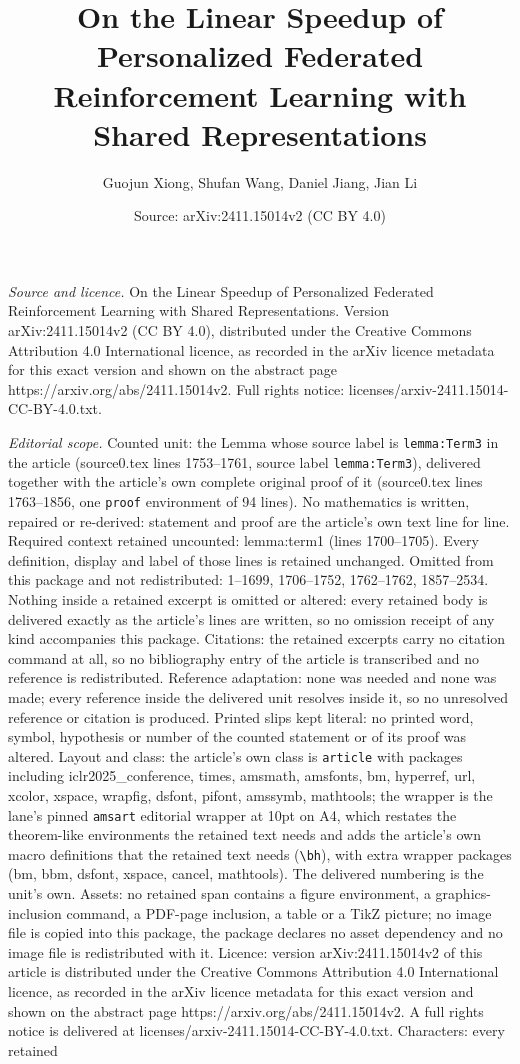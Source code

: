 \documentclass[10pt,a4paper]{amsart}
\title[On the Linear Speedup of Personalized Federated Reinforcemen]{On the Linear Speedup of Personalized Federated Reinforcement Learning with Shared Representations}
\author{Guojun Xiong, Shufan Wang, Daniel Jiang, Jian Li}
\date{Source: arXiv:2411.15014v2 (CC BY 4.0)}
\begin{document}
\maketitle

\noindent\emph{Source and licence.} On the Linear Speedup of Personalized Federated Reinforcement Learning with Shared Representations. Version arXiv:2411.15014v2 (CC BY 4.0), distributed under the Creative Commons Attribution 4.0 International licence, as recorded in the arXiv licence metadata for this exact version and shown on the abstract page https://arxiv.org/abs/2411.15014v2. Full rights notice: licenses/arxiv-2411.15014-CC-BY-4.0.txt.\par\smallskip

\noindent\textit{Editorial scope.} Counted unit: the Lemma whose source label is \texttt{lemma:Term3} in the article (source0.tex lines 1753--1761, source label \texttt{lemma:Term3}), delivered together with the article's own complete original proof of it (source0.tex lines 1763--1856, one \texttt{proof} environment of 94 lines). No mathematics is written, repaired or re-derived: statement and proof are the article's own text line for line. Required context retained uncounted: lemma:term1 (lines 1700--1705). Every definition, display and label of those lines is retained unchanged. Omitted from this package and not redistributed: 1--1699, 1706--1752, 1762--1762, 1857--2534. Nothing inside a retained excerpt is omitted or altered: every retained body is delivered exactly as the article's lines are written, so no omission receipt of any kind accompanies this package. Citations: the retained excerpts carry no citation command at all, so no bibliography entry of the article is transcribed and no reference is redistributed. Reference adaptation: none was needed and none was made; every reference inside the delivered unit resolves inside it, so no unresolved reference or citation is produced. Printed slips kept literal: no printed word, symbol, hypothesis or number of the counted statement or of its proof was altered. Layout and class: the article's own class is \texttt{article} with packages including iclr2025\_conference, times, amsmath, amsfonts, bm, hyperref, url, xcolor, xspace, wrapfig, dsfont, pifont, amssymb, mathtools; the wrapper is the lane's pinned \texttt{amsart} editorial wrapper at 10pt on A4, which restates the theorem-like environments the retained text needs and adds the article's own macro definitions that the retained text needs (\texttt{\textbackslash bh}), with extra wrapper packages (bm, bbm, dsfont, xspace, cancel, mathtools). The delivered numbering is the unit's own. Assets: no retained span contains a figure environment, a graphics-inclusion command, a PDF-page inclusion, a table or a TikZ picture; no image file is copied into this package, the package declares no asset dependency and no image file is redistributed with it. Licence: version arXiv:2411.15014v2 of this article is distributed under the Creative Commons Attribution 4.0 International licence, as recorded in the arXiv licence metadata for this exact version and shown on the abstract page https://arxiv.org/abs/2411.15014v2. A full rights notice is delivered at licenses/arxiv-2411.15014-CC-BY-4.0.txt. Characters: every retained 
\end{document}
